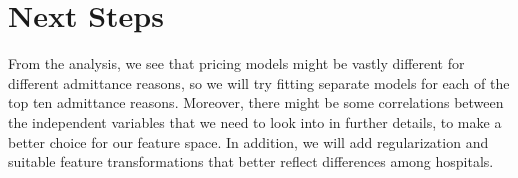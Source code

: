 \documentclass[letterpaper,11pt]{article}
\begin{document}
\section*{Next Steps}
From the analysis, we see that pricing models might be vastly different for different admittance reasons, so we will try fitting separate models for each of the top ten admittance reasons. Moreover, there might be some correlations between the independent variables that we need to look into in further details, to make a better choice for our feature space. In addition, we will add regularization and suitable feature transformations that better reflect differences among hospitals.
\end{document}
